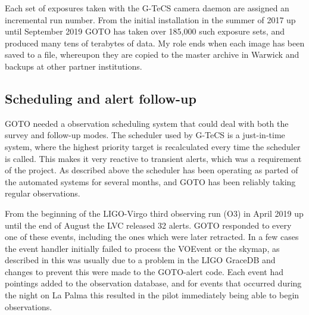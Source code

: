 \begin{colsection}
\begin{colsection}
Each set of exposures taken with the G-TeCS camera daemon are assigned an incremental run number. From the initial installation in the summer of 2017 up until September 2019 GOTO has taken over 185,000 such exposure sets, and produced many tens of terabytes of data. My role ends when each image has been saved to a file, whereupon they are copied to the master archive in Warwick and backups at other partner institutions.

\end{colsection}

\newpage
\subsection{Scheduling and alert follow-up}
\label{sec:gw_results}
\begin{colsection}

GOTO needed a observation scheduling system that could deal with both the survey and follow-up modes. The scheduler used by G-TeCS is a just-in-time system, where the highest priority target is recalculated every time the scheduler is called. This makes it very reactive to transient alerts, which was a requirement of the project. As described above the scheduler has been operating as parted of the automated systems for several months, and GOTO has been reliably taking regular observations.

From the beginning of the LIGO-Virgo third observing run (O3) in April 2019 up until the end of August the LVC released 32 alerts. GOTO responded to every one of these events, including the ones which were later retracted. In a few cases the event handler initially failed to process the VOEvent or the skymap, as described in  this was usually due to a problem in the LIGO GraceDB and changes to prevent this were made to the GOTO-alert code. Each event had pointings added to the observation database, and for events that occurred during the night on La Palma this resulted in the pilot immediately being able to begin observations.

\newpage

\begin{sidewaystable}[p]
    \begin{footnotesize}
    \begin{center}
        \begin{tabular}{l|cccrl} %


\end{tabular}
\end{center}
\end{footnotesize}
\end{sidewaystable}
\end{colsection}
\end{colsection}
